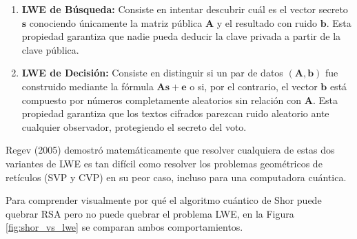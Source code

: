 \begin{enumerate}
	\item \textbf{LWE de Búsqueda:} Consiste en intentar descubrir cuál es el vector secreto $\mathbf{s}$ conociendo únicamente la matriz pública $\mathbf{A}$ y el resultado con ruido $\mathbf{b}$. Esta propiedad garantiza que nadie pueda deducir la clave privada a partir de la clave pública.

	\item \textbf{LWE de Decisión:} Consiste en distinguir si un par de datos $(\mathbf{A}, \mathbf{b})$ fue construido mediante la fórmula $\mathbf{A}\mathbf{s} + \mathbf{e}$ o si, por el contrario, el vector $\mathbf{b}$ está compuesto por números completamente aleatorios sin relación con $\mathbf{A}$. Esta propiedad garantiza que los textos cifrados parezcan ruido aleatorio ante cualquier observador, protegiendo el secreto del voto.
\end{enumerate}

Regev (2005) demostró matemáticamente que resolver cualquiera de estas dos variantes de LWE es tan difícil como resolver los problemas geométricos de retículos (SVP y CVP) en su peor caso, incluso para una computadora cuántica.

Para comprender visualmente por qué el algoritmo cuántico de Shor puede quebrar RSA pero no puede quebrar el problema LWE, en la Figura \ref{fig:shor_vs_lwe} se comparan ambos comportamientos.

